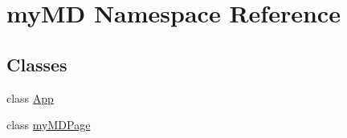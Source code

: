\hypertarget{namespacemy_m_d}{
\section{my\-MD Namespace Reference}
\label{d4/d16/namespacemy_m_d}
}


\subsection*{Classes}
\begin{CompactItemize}
\item 
class \hyperlink{classmy_m_d_1_1_app}{App}
\item 
class \hyperlink{classmy_m_d_1_1my_m_d_page}{my\-MDPage}
\end{CompactItemize}
